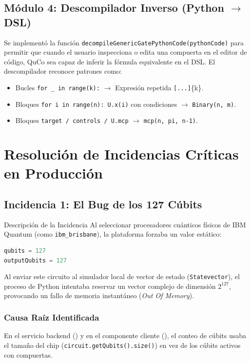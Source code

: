 \documentclass[11pt,a4paper]{article}
\begin{document}
\subsection{Módulo 4: Descompilador Inverso \texorpdfstring{(Python $\to$ DSL)}{(Python -> DSL)}}
Se implementó la función \texttt{decompileGenericGatePythonCode(pythonCode)} para permitir que cuando el usuario inspecciona o edita una compuerta en el editor de código, QuCo sea capaz de inferir la fórmula equivalente en el DSL. El descompilador reconoce patrones como:
\begin{itemize}
    \item Bucles \texttt{for \_ in range(k):} $\longrightarrow$ Expresión repetida \texttt{[...]}\{k\}.
    \item Bloques \texttt{for i in range(n): U.x(i)} con condiciones $\longrightarrow$ \texttt{Binary(n, m)}.
    \item Bloques \texttt{target / controls / U.mcp} $\longrightarrow$ \texttt{mcp(n, pi, n-1)}.
\end{itemize}

\section{Resolución de Incidencias Críticas en Producción}

\subsection{Incidencia 1: El Bug de los 127 Cúbits}

\begin{incidentcard}{Descripción de la Incidencia}
Al seleccionar procesadores cuánticos físicos de IBM Quantum (como \texttt{ibm\_brisbane}), la plataforma forzaba un valor estático:
\begin{lstlisting}[language=Python]
qubits = 127
outputQubits = 127
\end{lstlisting}
Al enviar este circuito al simulador local de vector de estado (\texttt{Statevector}), el proceso de Python intentaba reservar un vector complejo de dimensión $2^{127}$, provocando un fallo de memoria instantáneo (\textit{Out Of Memory}).
\end{incidentcard}

\subsubsection{Causa Raíz Identificada}
En el servicio backend () y en el componente cliente (), el conteo de cúbits usaba el tamaño del chip (\texttt{circuit.getQubits().size()}) en vez de los cúbits activos con compuertas.
\end{document}
